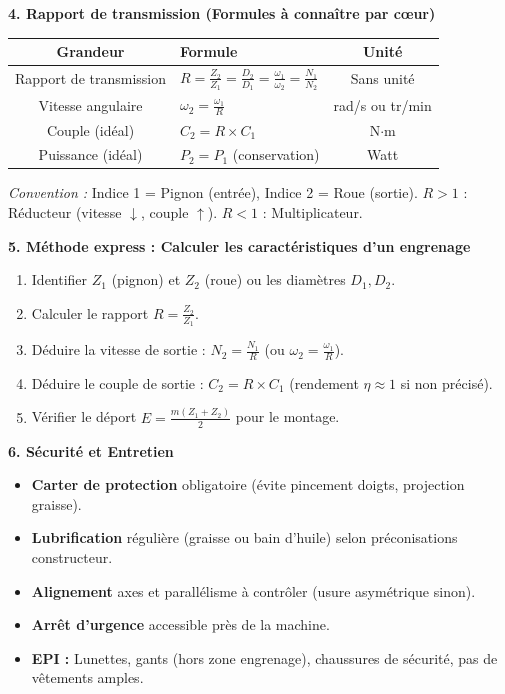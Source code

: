 \documentclass[11pt]{article}
\newcommand{\cle}[1]{{\popxbold\color{popdark}#1}}
\begin{document}
\begin{bilan}
\textbf{4. Rapport de transmission (Formules à connaître par cœur)}
\begin{center}
\begin{tabularx}{\linewidth}{|c|X|c|}\hline
\rowcolor{poporangeL}
\cle{Grandeur} & \cle{Formule} & \cle{Unité} \\ \hline
Rapport de transmission & $R = \frac{Z_2}{Z_1} = \frac{D_2}{D_1} = \frac{\omega_1}{\omega_2} = \frac{N_1}{N_2}$ & Sans unité \\ \hline
Vitesse angulaire & $\omega_2 = \frac{\omega_1}{R}$ & rad/s ou tr/min \\ \hline
Couple (idéal) & $C_2 = R \times C_1$ & N$\cdot$m \\ \hline
Puissance (idéal) & $P_2 = P_1$ (conservation) & Watt \\ \hline
\end{tabularx}
\end{center}
\emph{Convention :} Indice 1 = Pignon (entrée), Indice 2 = Roue (sortie). $R > 1$ : Réducteur (vitesse $\downarrow$, couple $\uparrow$). $R < 1$ : Multiplicateur.

\textbf{5. Méthode express : Calculer les caractéristiques d'un engrenage}
\begin{enumerate}
  \item Identifier $Z_1$ (pignon) et $Z_2$ (roue) ou les diamètres $D_1, D_2$.
  \item Calculer le rapport $R = \frac{Z_2}{Z_1}$.
  \item Déduire la vitesse de sortie : $N_2 = \frac{N_1}{R}$ (ou $\omega_2 = \frac{\omega_1}{R}$).
  \item Déduire le couple de sortie : $C_2 = R \times C_1$ (rendement $\eta \approx 1$ si non précisé).
  \item Vérifier le déport $E = \frac{m(Z_1+Z_2)}{2}$ pour le montage.
\end{enumerate}

\textbf{6. Sécurité et Entretien}
\begin{itemize}
  \item \textbf{Carter de protection} obligatoire (évite pincement doigts, projection graisse).
  \item \textbf{Lubrification} régulière (graisse ou bain d'huile) selon préconisations constructeur.
  \item \textbf{Alignement} axes et parallélisme à contrôler (usure asymétrique sinon).
  \item \textbf{Arrêt d'urgence} accessible près de la machine.
  \item \textbf{EPI :} Lunettes, gants (hors zone engrenage), chaussures de sécurité, pas de vêtements amples.
\end{itemize}

\end{bilan}
\end{document}
